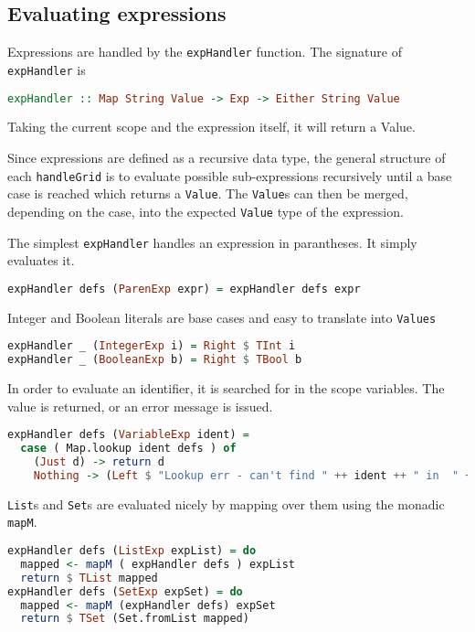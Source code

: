 \subsection{Evaluating expressions}

Expressions are handled by the \lstinline{expHandler} function. The signature of \lstinline{expHandler} is
\begin{lstlisting}[caption={},language=haskell]
expHandler :: Map String Value -> Exp -> Either String Value
\end{lstlisting}

Taking the current scope and the expression itself, it will return a Value.

Since expressions are defined as a recursive data type, the general structure of each \lstinline{handleGrid} is to evaluate possible sub-expressions recursively until a base case is reached which returns a \lstinline{Value}. The \lstinline{Value}s can then be merged, depending on the case, into the expected \lstinline{Value} type of the expression.

The simplest \lstinline{expHandler} handles an expression in parantheses. It simply evaluates it.
\begin{lstlisting}[caption={},language=haskell]
expHandler defs (ParenExp expr) = expHandler defs expr
\end{lstlisting}

Integer and Boolean literals are base cases and easy to translate into \lstinline{Values}
\begin{lstlisting}[caption={},language=haskell]
expHandler _ (IntegerExp i) = Right $ TInt i
expHandler _ (BooleanExp b) = Right $ TBool b
\end{lstlisting}

In order to evaluate an identifier, it is searched for in the scope variables. The value is returned, or an error message is issued.
\begin{lstlisting}[caption={},language=haskell]
expHandler defs (VariableExp ident) =
  case ( Map.lookup ident defs ) of
    (Just d) -> return d
    Nothing -> (Left $ "Lookup err - can't find " ++ ident ++ " in  " ++ show defs)
\end{lstlisting}

\lstinline{List}s and \lstinline{Set}s are evaluated nicely by mapping over them using the monadic \lstinline{mapM}.
\begin{lstlisting}[caption={},language=haskell]
expHandler defs (ListExp expList) = do
  mapped <- mapM ( expHandler defs ) expList
  return $ TList mapped
expHandler defs (SetExp expSet) = do
  mapped <- mapM (expHandler defs) expSet
  return $ TSet (Set.fromList mapped)
\end{lstlisting}

